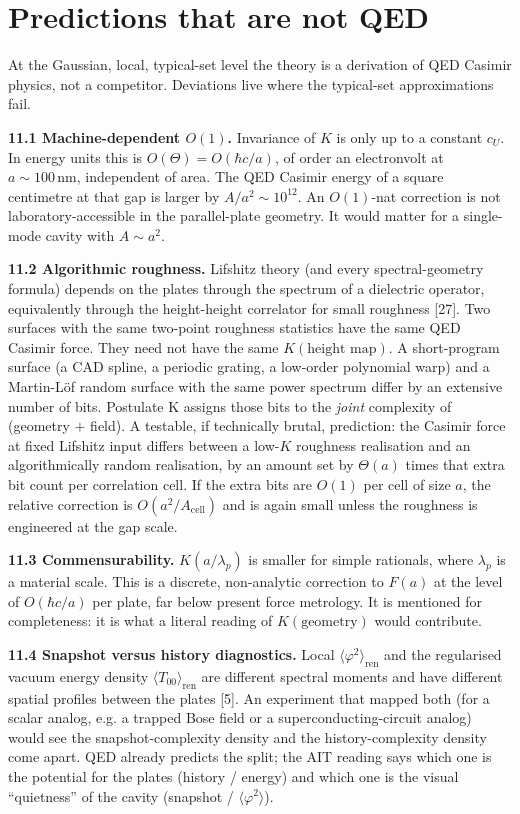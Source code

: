 \documentclass[11pt,letterpaper]{article}
\begin{document}
\section{Predictions that are not QED}


At the Gaussian, local, typical-set level the theory is a derivation of QED Casimir physics, not a competitor. Deviations live where the typical-set approximations fail.


\textbf{11.1 Machine-dependent \(O(1)\).} Invariance of \(K\) is only up to a constant \(c_U\). In energy units this is \(O(\Theta)=O(\hbar c/a)\), of order an electronvolt at \(a\sim 100\,\mathrm{nm}\), independent of area. The QED Casimir energy of a square centimetre at that gap is larger by \(A/a^{2}\sim 10^{12}\). An \(O(1)\)-nat correction is not laboratory-accessible in the parallel-plate geometry. It would matter for a single-mode cavity with \(A\sim a^{2}\).


\textbf{11.2 Algorithmic roughness.} Lifshitz theory (and every spectral-geometry formula) depends on the plates through the spectrum of a dielectric operator, equivalently through the height-height correlator for small roughness [27]. Two surfaces with the same two-point roughness statistics have the same QED Casimir force. They need not have the same \(K(\text{height map})\). A short-program surface (a CAD spline, a periodic grating, a low-order polynomial warp) and a Martin-Löf random surface with the same power spectrum differ by an extensive number of bits. Postulate K assigns those bits to the \emph{joint} complexity of (geometry \(+\) field). A testable, if technically brutal, prediction: the Casimir force at fixed Lifshitz input differs between a low-\(K\) roughness realisation and an algorithmically random realisation, by an amount set by \(\Theta(a)\) times that extra bit count per correlation cell. If the extra bits are \(O(1)\) per cell of size \(a\), the relative correction is \(O(a^{2}/A_{\mathrm{cell}})\) and is again small unless the roughness is engineered at the gap scale.


\textbf{11.3 Commensurability.} \(K(a/\lambda_p)\) is smaller for simple rationals, where \(\lambda_p\) is a material scale. This is a discrete, non-analytic correction to \(F(a)\) at the level of \(O(\hbar c/a)\) per plate, far below present force metrology. It is mentioned for completeness: it is what a literal reading of \(K(\text{geometry})\) would contribute.


\textbf{11.4 Snapshot versus history diagnostics.} Local \(\langle\varphi^{2}\rangle_{\mathrm{ren}}\) and the regularised vacuum energy density \(\langle T_{00}\rangle_{\mathrm{ren}}\) are different spectral moments and have different spatial profiles between the plates [5]. An experiment that mapped both (for a scalar analog, e.g. a trapped Bose field or a superconducting-circuit analog) would see the snapshot-complexity density and the history-complexity density come apart. QED already predicts the split; the AIT reading says which one is the potential for the plates (history / energy) and which one is the visual “quietness” of the cavity (snapshot / \(\langle\varphi^{2}\rangle\)).
\end{document}
